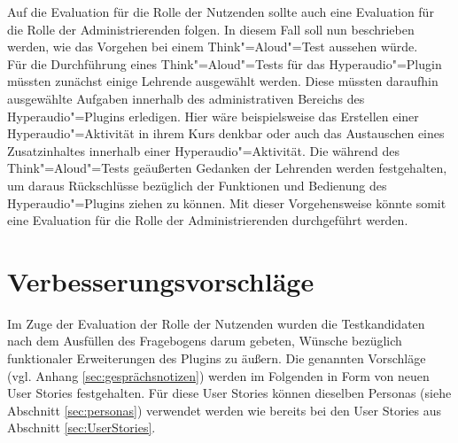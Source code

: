 Auf die Evaluation für die Rolle der Nutzenden sollte auch eine Evaluation für die Rolle der Administrierenden folgen. In diesem Fall soll nun beschrieben werden, wie das Vorgehen bei einem Think"=Aloud"=Test aussehen würde.\\
Für die Durchführung eines Think"=Aloud"=Tests für das Hyperaudio"=Plugin müssten zunächst einige Lehrende ausgewählt werden. Diese müssten daraufhin ausgewählte Aufgaben innerhalb des administrativen Bereichs des Hyperaudio"=Plugins erledigen. Hier wäre beispielsweise das Erstellen einer Hyperaudio"=Aktivität in ihrem Kurs denkbar oder auch das Austauschen eines Zusatzinhaltes innerhalb einer Hyperaudio"=Aktivität. Die während des Think"=Aloud"=Tests geäußerten Gedanken der Lehrenden werden festgehalten, um daraus Rückschlüsse bezüglich der Funktionen und Bedienung des Hyperaudio"=Plugins ziehen zu können. Mit dieser Vorgehensweise könnte somit eine Evaluation für die Rolle der Administrierenden durchgeführt werden.






\section{Verbesserungsvorschläge}
\label{sec:Verbesserungsvorschlaege}
Im Zuge der Evaluation der Rolle der Nutzenden wurden die Testkandidaten nach dem Ausfüllen des Fragebogens darum gebeten, Wünsche bezüglich funktionaler Erweiterungen des Plugins zu äußern. Die genannten Vorschläge (vgl. Anhang \ref{sec:gesprächsnotizen}) werden im Folgenden in Form von neuen User Stories festgehalten. Für diese User Stories können dieselben Personas (siehe Abschnitt \ref{sec:personas}) verwendet werden wie bereits bei den User Stories aus Abschnitt \ref{sec:UserStories}.

